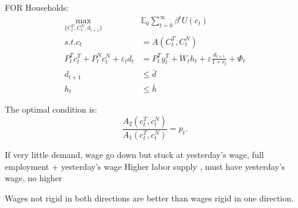 FOR Households:
\begin{align}
    \max_{\{C_t^T, C_t^N, d_{t+1} \}} & \mathbb{E}_0 \sum_{t=0}^{\infty}\beta^{t}U(c_t)\\
    s.t. c_t &= A(C_t^T, C_t^N)\\
    P_t^T c_t^T + P_t^N c_t^N + \varepsilon_t d_t &= P_t^T y_t^T + W_t h_t + \varepsilon \frac{d_{t+1}}{1+r_t}+\Phi_t\\
    d_{t+1} & \leq \bar{d}\\
    h_t & \leq \bar{h} 
\end{align}

The optimal condition is:
\[\frac{A_2(c_t^T, c_t^N)}{A_1(c_t^T, c_t^N)} = p_t.\]

If very little demand, wage go down but stuck at yesterday's wage,
full employment + yesterday's wage
Higher labor supply , must have yesterday's wage, no higher

Wages not rigid in both directions are better than wages rigid in one direction.

